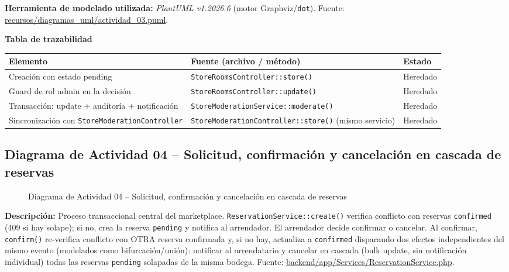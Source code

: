 \bigskip
{\sloppy\noindent\textbf{Herramienta de modelado utilizada:} \textit{PlantUML v1.2026.6} (motor Graphviz/\texttt{dot}). Fuente: \url{recursos/diagramas_uml/actividad_03.puml}.\par}

\bigskip
\noindent\textbf{Tabla de trazabilidad}
\begin{longtable}{|L{4cm}|L{7.5cm}|M{2.3cm}|}
\hline
{} \textbf{Elemento} & \textbf{Fuente (archivo / método)} & \textbf{Estado} \\ \hline
\endhead
Creación con estado pending & \texttt{StoreRoomsController::store()} & Heredado \\ \hline
Guard de rol admin en la decisión & \texttt{StoreRoomsController::update()} & Heredado \\ \hline
Transacción: update + auditoría + notificación & \texttt{StoreModerationService::moderate()} & Heredado \\ \hline
Sincronización con \texttt{StoreModerationController} & \texttt{StoreModerationController::store()} (mismo servicio) & Heredado \\ \hline
\end{longtable}
\clearpage

\subsection{Diagrama de Actividad 04 -- Solicitud, confirmación y cancelación en cascada de reservas}
\begin{figure}[H]
    \centering
    \caption{Diagrama de Actividad 04 -- Solicitud, confirmación y cancelación en cascada de reservas}
    \label{fig:actividad04}
\end{figure}

{\sloppy\noindent\textbf{Descripción:} Proceso transaccional central del marketplace. \texttt{ReservationService::create()} verifica conflicto con reservas \texttt{confirmed} (409 si hay solape); si no, crea la reserva \texttt{pending} y notifica al arrendador. El arrendador decide confirmar o cancelar. Al confirmar, \texttt{confirm()} re-verifica conflicto con OTRA reserva confirmada y, si no hay, actualiza a \texttt{confirmed} disparando dos efectos independientes del mismo evento (modelados como bifurcación/unión): notificar al arrendatario y cancelar en cascada (bulk update, sin notificación individual) todas las reservas \texttt{pending} solapadas de la misma bodega. Fuente: \url{backend/app/Services/ReservationService.php}.\par}


